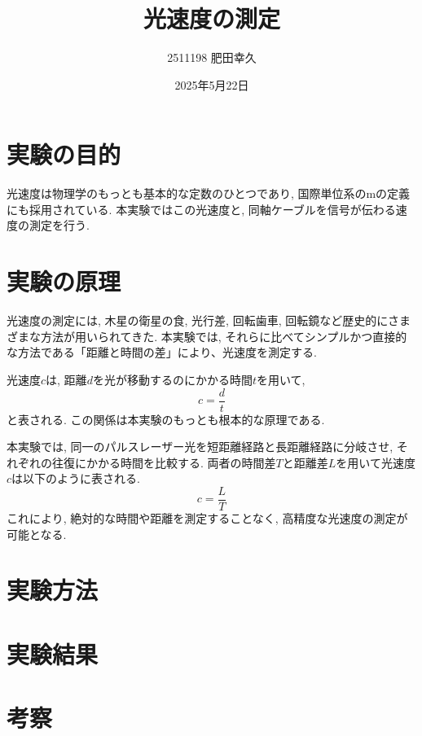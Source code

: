 \documentclass{jarticle}
\title{光速度の測定}
\author{2511198 肥田幸久}
\date{2025年5月22日}
\begin{document}
\maketitle



\section{実験の目的}
光速度は物理学のもっとも基本的な定数のひとつであり, 国際単位系の$\mathrm{m}$の定義にも採用されている. 本実験ではこの光速度と, 同軸ケーブルを信号が伝わる速度の測定を行う.


\section{実験の原理}
光速度の測定には, 木星の衛星の食, 光行差, 回転歯車, 回転鏡など歴史的にさまざまな方法が用いられてきた. 本実験では, それらに比べてシンプルかつ直接的な方法である「距離と時間の差」により、光速度を測定する.

光速度$c$は, 距離$d$を光が移動するのにかかる時間$t$を用いて,
\begin{equation}
  c=\frac{d}{t}
\end{equation}
と表される. この関係は本実験のもっとも根本的な原理である.

本実験では, 同一のパルスレーザー光を短距離経路と長距離経路に分岐させ, それぞれの往復にかかる時間を比較する. 両者の時間差$T$と距離差$L$を用いて光速度$c$は以下のように表される.
\begin{equation}
  c=\frac{L}{T}
\end{equation}
これにより, 絶対的な時間や距離を測定することなく, 高精度な光速度の測定が可能となる.



\section{実験方法}



\section{実験結果}



\section{考察}



\begin{thebibliography}{99}


\end{thebibliography}
\end{document}
